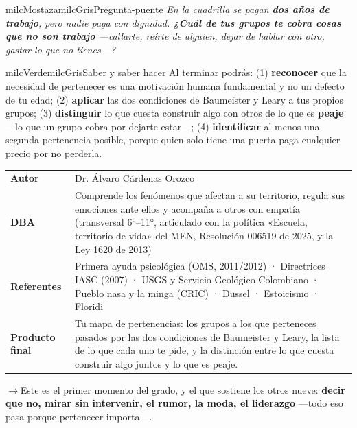 \documentclass[11pt,letterpaper]{article}
\newcommand{\puente}[1]{%
  \begin{puentebox}%
    \textcolor{milcGradeDark}{$\rightarrow$}\hspace{2mm}#1%
  \end{puentebox}%
}
\begin{document}
\begin{softbox}{milcMostaza}{milcGris}{Pregunta-puente}
\textit{En la cuadrilla se pagan \textbf{dos años de trabajo}, pero nadie paga con dignidad. \textbf{¿Cuál de tus grupos te cobra cosas que no son trabajo} ---callarte, reírte de alguien, dejar de hablar con otro, gastar lo que no tienes---?}
\end{softbox}

\begin{softbox}{milcVerde}{milcGris}{Saber y saber hacer}
Al terminar podrás: (1) \textbf{reconocer} que la necesidad de pertenecer es una motivación humana fundamental y no un defecto de tu edad; (2) \textbf{aplicar} las dos condiciones de Baumeister y Leary a tus propios grupos; (3) \textbf{distinguir} lo que cuesta construir algo con otros de lo que es \textbf{peaje} ---lo que un grupo cobra por dejarte estar---; (4) \textbf{identificar} al menos una segunda pertenencia posible, porque quien solo tiene una puerta paga cualquier precio por no perderla.
\end{softbox}



\small
\begin{tabularx}{\textwidth}{>{\bfseries}p{3.0cm}Y}
Autor & Dr. Álvaro Cárdenas Orozco\\
DBA & Comprende los fenómenos que afectan a su territorio, regula sus emociones ante ellos y acompaña a otros con empatía (transversal 6°--11°, articulado con la política «Escuela, territorio de vida» del MEN, Resolución 006519 de 2025, y la Ley 1620 de 2013)\\
Referentes & Primera ayuda psicológica (OMS, 2011/2012) · Directrices IASC (2007) · USGS y Servicio Geológico Colombiano · Pueblo nasa y la minga (CRIC) · Dussel · Estoicismo · Floridi\\
Producto final & Tu mapa de pertenencias: los grupos a los que perteneces pasados por las dos condiciones de Baumeister y Leary, la lista de lo que cada uno te pide, y la distinción entre lo que cuesta construir algo juntos y lo que es peaje.\\
\end{tabularx}
\normalsize

\puente{Este es el primer momento del grado, y el que sostiene los otros nueve: \textbf{decir que no, mirar sin intervenir, el rumor, la moda, el liderazgo} ---todo eso pasa porque pertenecer importa---.}
\end{document}
